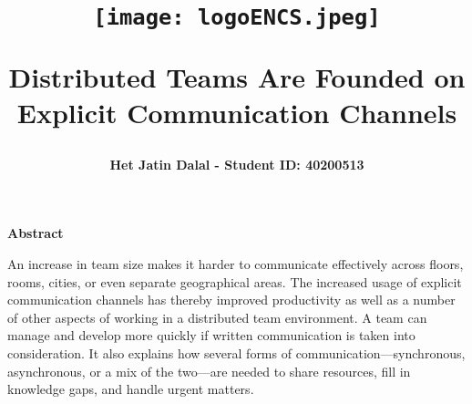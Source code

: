 \documentclass{llncs}
\renewenvironment{abstract}{%
  \begin{center}%
    {\large\bfseries Abstract}%
  \end{center}%
  \quotation
}{%
  \endquotation
}
\begin{document}
%

\title{

\begin{figure}[ht]
    \centering
    \texttt{[image: logoENCS.jpeg]}
    \label{fig:example}
\end{figure}

Distributed Teams Are Founded on Explicit
Communication Channels\vspace{30pt}}
%
%

\author{\large \textbf{Het Jatin Dalal - Student ID: 40200513}\vspace{10pt}}
%
%

{\def\addcontentsline#1#2#3{}\maketitle}

\newpage
\begin{abstract}
\large An increase in team size makes it harder to communicate effectively across floors, rooms, cities, or even separate geographical areas. The increased usage of explicit communication channels has thereby improved productivity as well as a number of other aspects of working in a distributed team environment. A team can manage and develop more quickly if written communication is taken into consideration. It also explains how several forms of communication—synchronous, asynchronous, or a mix of the two—are needed to share resources, fill in knowledge gaps, and handle urgent matters. 

\end{abstract}
%
%
%
\tableofcontents
\newpage


\end{document}
